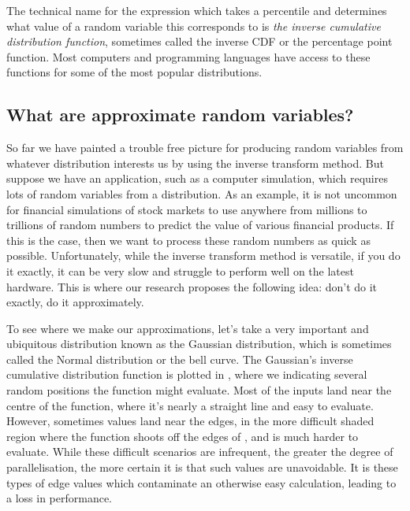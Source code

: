 \documentclass[11pt,a4paper,twoside,english]{extarticle}
\begin{document}
The technical name for the expression which takes a percentile and determines what value of a random variable this corresponds to is \emph{the inverse cumulative distribution function}, sometimes called the inverse CDF or the percentage point function. Most computers and programming languages have access to these functions for some of the most popular distributions. 

\subsection{What are approximate random variables?}
\label{sec:what_are_approximate_random_variables}

So far we have painted a trouble free picture for producing random variables from whatever distribution interests us by using the inverse transform method. But suppose we have an application, such as a computer simulation, which requires lots of random variables from a distribution. As an example, it is not uncommon for financial simulations of stock markets to use anywhere from millions to trillions of random numbers to predict the value of various financial products. If this is the case, then we want to process these random numbers as quick as possible. Unfortunately, while the inverse transform method is versatile, if you do it exactly, it can be very slow and struggle to perform well on the latest hardware. This is where our research proposes the following idea: don't do it exactly, do it approximately. 

To see where we make our approximations, let's take a very important and ubiquitous distribution known as the Gaussian distribution, which is sometimes called the Normal distribution or the bell curve. The Gaussian's inverse cumulative distribution function is plotted in ,
where we indicating several random positions the function might evaluate. Most of the inputs land near the centre of the function, where it's nearly a straight line and easy to evaluate. However, sometimes values land near the edges, in the more difficult shaded region where the function shoots off the edges of , and is much harder to evaluate. While these difficult scenarios are infrequent, the greater the degree of parallelisation, the more certain it is that such values are unavoidable. It is these types of edge values which contaminate an otherwise easy calculation, leading to a loss in performance. 
\end{document}
